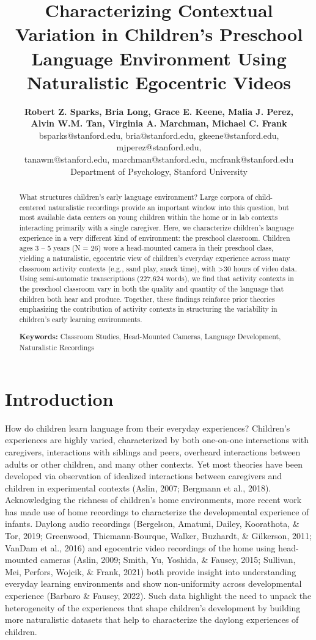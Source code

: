 \documentclass[10pt, letterpaper]{article}
\title{Characterizing Contextual Variation in Children's Preschool
Language Environment Using Naturalistic Egocentric Videos}
\author{{\large \bf Robert Z. Sparks, Bria Long, Grace E. Keene, Malia J. Perez,} \\ {\large \bf Alvin W.M. Tan, Virginia A. Marchman, Michael C. Frank} \\ bsparks@stanford.edu, bria@stanford.edu, gkeene@stanford.edu, mjperez@stanford.edu, \\ tanawm@stanford.edu, marchman@stanford.edu, mcfrank@stanford.edu \\ Department of Psychology, Stanford University}
\begin{document}
\maketitle

\begin{abstract}
What structures children's early language environment? Large corpora of
child-centered naturalistic recordings provide an important window into
this question, but most available data centers on young children within
the home or in lab contexts interacting primarily with a single
caregiver. Here, we characterize children's language experience in a
very different kind of environment: the preschool classroom. Children
ages 3 -- 5 years (N = 26) wore a head-mounted camera in their preschool
class, yielding a naturalistic, egocentric view of children's everyday
experience across many classroom activity contexts (e.g., sand play,
snack time), with \textgreater30 hours of video data. Using
semi-automatic transcriptions (227,624 words), we find that activity
contexts in the preschool classroom vary in both the quality and
quantity of the language that children both hear and produce. Together,
these findings reinforce prior theories emphasizing the contribution of
activity contexts in structuring the variability in children's early
learning environments.

\textbf{Keywords:}
Classroom Studies, Head-Mounted Cameras, Language Development,
Naturalistic Recordings
\end{abstract}

\hypertarget{introduction}{%
\section{Introduction}\label{introduction}}

How do children learn language from their everyday experiences?
Children's experiences are highly varied, characterized by both
one-on-one interactions with caregivers, interactions with siblings and
peers, overheard interactions between adults or other children, and many
other contexts. Yet most theories have been developed via observation of
idealized interactions between caregivers and children in experimental
contexts (Aslin, 2007; Bergmann et al., 2018). Acknowledging the
richness of children's home environments, more recent work has made use
of home recordings to characterize the developmental experience of
infants. Daylong audio recordings (Bergelson, Amatuni, Dailey,
Koorathota, \& Tor, 2019; Greenwood, Thiemann-Bourque, Walker, Buzhardt,
\& Gilkerson, 2011; VanDam et al., 2016) and egocentric video recordings
of the home using head-mounted cameras (Aslin, 2009; Smith, Yu, Yoshida,
\& Fausey, 2015; Sullivan, Mei, Perfors, Wojcik, \& Frank, 2021) both
provide insight into understanding everyday learning environments and
show non-uniformity across developmental experience (Barbaro \& Fausey,
2022). Such data highlight the need to unpack the heterogeneity of the
experiences that shape children's development by building more
naturalistic datasets that help to characterize the daylong experiences
of children.
\end{document}
